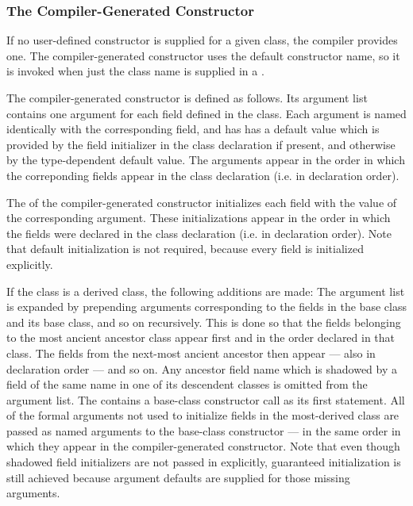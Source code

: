 \subsubsection{The Compiler-Generated Constructor}
\label{The_Compiler_Generated_Constructor}

If no user-defined constructor is supplied for a given class, the compiler
provides one.  The compiler-generated constructor uses the default constructor
name, so it is invoked when just the class name is supplied in
a .  

The compiler-generated constructor is defined as follows.  Its argument list
contains one argument for each field defined in the class.  Each argument is
named identically with the corresponding field, and has has a default value
which is provided by the field initializer in the class declaration if present,
and otherwise by the type-dependent default value.  The arguments appear in the
order in which the correponding fields appear in the class declaration (i.e. in
declaration order).

The  of the compiler-generated
constructor initializes each field with the value of the corresponding
argument.  These initializations appear in the order in which the fields were
declared in the class declaration (i.e. in declaration order).  Note that default
initialization is not required, because every field is initialized explicitly.

If the class is a derived class, the following additions are made: The argument
list is expanded by prepending arguments corresponding to the fields in the base
class and its base class, and so on recursively.  This is done so that the
fields belonging to the most ancient ancestor class appear first and in the
order declared in that class.  The fields from the next-most ancient ancestor
then appear --- also in declaration order --- and so on.  Any ancestor field name
which is shadowed by a field of the same name in one of its descendent classes
is omitted from the argument
list.  The  contains a base-class constructor call
as its first statement.  All of the formal arguments not used to initialize
fields in the most-derived class are passed as named arguments to the
base-class constructor --- in the same order in which they appear in the
compiler-generated constructor.
Note that even though shadowed field initializers are not passed in explicitly,
guaranteed initialization is still achieved because argument defaults are
supplied for those missing arguments.

